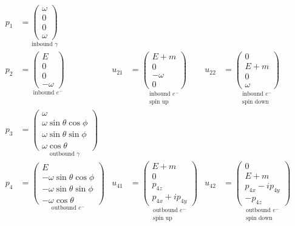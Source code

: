 \documentclass[12pt]{article}
\begin{document}
\else
\begin{align*}
p_1&=\underset{\text{inbound $\gamma$}}
{\begin{pmatrix}\omega\\0\\0\\ \omega\end{pmatrix}}
\\[1ex]
p_2&=\underset{\text{inbound $e^-$}}
{\begin{pmatrix}E\\0\\0\\-\omega\end{pmatrix}}
& u_{21}&=\underset{\substack{\text{inbound $e^-$}\\\text{spin up}}}
{\begin{pmatrix}E+m\\0\\-\omega\\0\end{pmatrix}}
& u_{22}&=\underset{\substack{\text{inbound $e^-$}\\\text{spin down}}}
{\begin{pmatrix}0\\E+m\\0\\\omega\end{pmatrix}}
\\[1ex]
p_3&=\underset{\text{outbound $\gamma$}}
{\begin{pmatrix}\omega\\\omega\sin\theta\cos\phi\\\omega\sin\theta\sin\phi\\\omega\cos\theta\end{pmatrix}}
\\[1ex]
p_4&=\underset{\text{outbound $e^-$}}
{\begin{pmatrix}E\\-\omega\sin\theta\cos\phi\\-\omega\sin\theta\sin\phi\\-\omega\cos\theta\end{pmatrix}}
& u_{41}&=\underset{\substack{\text{outbound $e^-$}\\\text{spin up}}}
{\begin{pmatrix}E+m\\0\\p_{4z}\\p_{4x}+ip_{4y}\end{pmatrix}}
& u_{42}&=\underset{\substack{\text{outbound $e^-$}\\\text{spin down}}}
{\begin{pmatrix}0\\E+m\\p_{4x}-ip_{4y}\\-p_{4z}\end{pmatrix}}
\end{align*}
\fi
\end{document}
